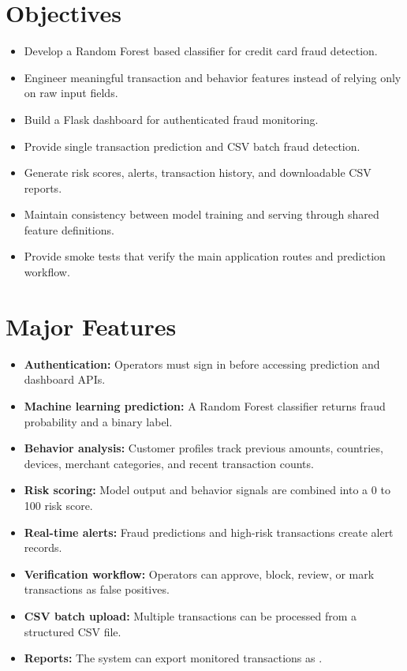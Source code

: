 \documentclass[12pt,a4paper]{report}
\begin{document}
\section{Objectives}
\begin{itemize}
    \item Develop a Random Forest based classifier for credit card fraud detection.
    \item Engineer meaningful transaction and behavior features instead of relying only on raw input fields.
    \item Build a Flask dashboard for authenticated fraud monitoring.
    \item Provide single transaction prediction and CSV batch fraud detection.
    \item Generate risk scores, alerts, transaction history, and downloadable CSV reports.
    \item Maintain consistency between model training and serving through shared feature definitions.
    \item Provide smoke tests that verify the main application routes and prediction workflow.
\end{itemize}

\section{Major Features}
\begin{itemize}
    \item \textbf{Authentication:} Operators must sign in before accessing prediction and dashboard APIs.
    \item \textbf{Machine learning prediction:} A Random Forest classifier returns fraud probability and a binary label.
    \item \textbf{Behavior analysis:} Customer profiles track previous amounts, countries, devices, merchant categories, and recent transaction counts.
    \item \textbf{Risk scoring:} Model output and behavior signals are combined into a 0 to 100 risk score.
    \item \textbf{Real-time alerts:} Fraud predictions and high-risk transactions create alert records.
    \item \textbf{Verification workflow:} Operators can approve, block, review, or mark transactions as false positives.
    \item \textbf{CSV batch upload:} Multiple transactions can be processed from a structured CSV file.
    \item \textbf{Reports:} The system can export monitored transactions as .
\end{itemize}
\end{document}
